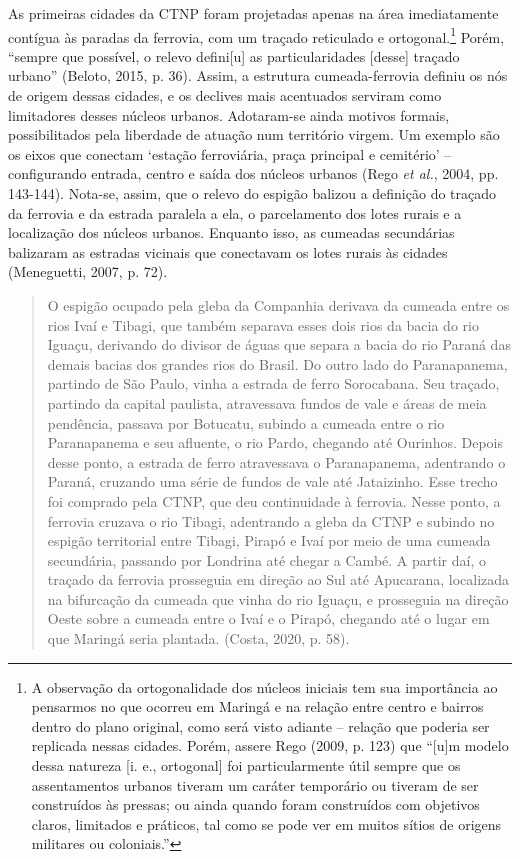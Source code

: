 \documentclass[12pt, a4paper]{book} %
\begin{document}
        As primeiras cidades da CTNP foram projetadas apenas na área imediatamente contígua às paradas da ferrovia, com um traçado reticulado e ortogonal.\footnote[0]{A observação da ortogonalidade dos núcleos iniciais tem sua importância ao pensarmos no que ocorreu em Maringá e na relação entre centro e bairros dentro do plano original, como será visto adiante – relação que poderia ser replicada nessas cidades. Porém, assere Rego (2009, p. 123) que ``[u]m modelo dessa natureza [i. e., ortogonal] foi particularmente útil sempre que os assentamentos urbanos tiveram um caráter temporário ou tiveram de ser construídos às pressas; ou ainda quando foram construídos com objetivos claros, limitados e práticos, tal como se pode ver em muitos sítios de origens militares ou coloniais.''} Porém, ``sempre que possível, o relevo defini[u] as particularidades [desse] traçado urbano'' (Beloto, 2015, p. 36). Assim, a estrutura cumeada-ferrovia definiu os nós de origem dessas cidades, e os declives mais acentuados serviram como limitadores desses núcleos urbanos. Adotaram-se ainda motivos formais, possibilitados pela liberdade de atuação num território virgem. Um exemplo são os eixos que conectam `estação ferroviária, praça principal e cemitério' – configurando entrada, centro e saída dos núcleos urbanos (Rego \textit{et al.}, 2004, pp. 143-144). Nota-se, assim, que o relevo do espigão balizou a definição do traçado da ferrovia e da estrada paralela a ela, o parcelamento dos lotes rurais e a localização dos núcleos urbanos. Enquanto isso, as cumeadas secundárias balizaram as estradas vicinais que conectavam os lotes rurais às cidades (Meneguetti, 2007, p. 72).%

        \begin{quotation}
            O espigão ocupado pela gleba da Companhia derivava da cumeada entre os rios Ivaí e Tibagi, que também separava esses dois rios da bacia do rio Iguaçu, derivando do divisor de águas que separa a bacia do rio Paraná das demais bacias dos grandes rios do Brasil. Do outro lado do Paranapanema, partindo de São Paulo, vinha a estrada de ferro Sorocabana. Seu traçado, partindo da capital paulista, atravessava fundos de vale e áreas de meia pendência, passava por Botucatu, subindo a cumeada entre o rio Paranapanema e seu afluente, o rio Pardo, chegando até Ourinhos. Depois desse ponto, a estrada de ferro atravessava o Paranapanema, adentrando o Paraná, cruzando uma série de fundos de vale até Jataizinho. Esse trecho foi comprado pela CTNP, que deu continuidade à ferrovia. Nesse ponto, a ferrovia cruzava o rio Tibagi, adentrando a gleba da CTNP e subindo no espigão territorial entre Tibagi, Pirapó e Ivaí por meio de uma cumeada secundária, passando por Londrina até chegar a Cambé. A partir daí, o traçado da ferrovia prosseguia em direção ao Sul até Apucarana, localizada na bifurcação da cumeada que vinha do rio Iguaçu, e prosseguia na direção Oeste sobre a cumeada entre o Ivaí e o Pirapó, chegando até o lugar em que Maringá seria plantada. (Costa, 2020, p. 58).
        \end{quotation}
\end{document}
